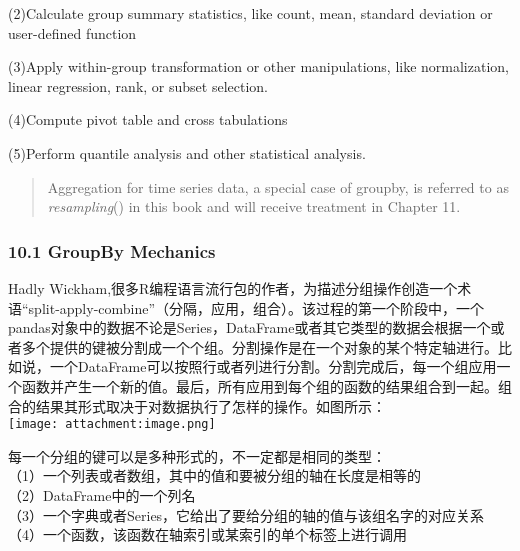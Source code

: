 \documentclass[11pt]{article}
\makeatletter
\def\maxwidth{\ifdim\Gin@nat@width>\linewidth\linewidth
    \else\Gin@nat@width\fi}
\let\Oldincludegraphics\includegraphics
\renewcommand{\includegraphics}[1]{\Oldincludegraphics[width=.8\maxwidth]{#1}}
\makeatother
\begin{document}
(2)Calculate group summary statistics, like count, mean, standard
deviation or user-defined function

(3)Apply within-group transformation or other manipulations, like
normalization, linear regression, rank, or subset selection.

(4)Compute pivot table and cross tabulations

(5)Perform quantile analysis and other statistical analysis.

    \begin{quote}
Aggregation for time series data, a special case of groupby, is referred
to as \emph{resampling}() in this book and will receive treatment in
Chapter 11.
\end{quote}

    \hypertarget{groupby-mechanics}{%
\subsubsection{10.1 GroupBy Mechanics}\label{groupby-mechanics}}

    Hadly
Wickham,很多R编程语言流行包的作者，为描述分组操作创造一个术语``split-apply-combine''（分隔，应用，组合）。该过程的第一个阶段中，一个pandas对象中的数据不论是Series，DataFrame或者其它类型的数据会根据一个或者多个提供的键被分割成一个个组。分割操作是在一个对象的某个特定轴进行。比如说，一个DataFrame可以按照行或者列进行分割。分割完成后，每一个组应用一个函数并产生一个新的值。最后，所有应用到每个组的函数的结果组合到一起。组合的结果其形式取决于对数据执行了怎样的操作。如图所示：\\
\texttt{[image: attachment:image.png]}

    每一个分组的键可以是多种形式的，不一定都是相同的类型：\\
（1）一个列表或者数组，其中的值和要被分组的轴在长度是相等的\\
（2）DataFrame中的一个列名\\
（3）一个字典或者Series，它给出了要给分组的轴的值与该组名字的对应关系\\
（4）一个函数，该函数在轴索引或某索引的单个标签上进行调用
\end{document}
